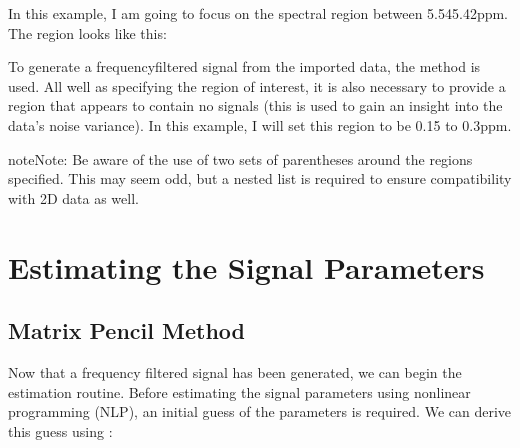 \documentclass[letterpaper,10pt,english]{sphinxmanual}
\let\sphinxpxdimen\pdfpxdimen\else\newdimen\sphinxpxdimen
\begin{document}
\sphinxAtStartPar
In this example, I am going to focus on the spectral region between
5.54\sphinxhyphen{}5.42ppm. The region looks like this:

\noindent{\hspace*{\fill}\sphinxincludegraphics[width=450\sphinxpxdimen]{{spectral_region}.png}\hspace*{\fill}}

\sphinxAtStartPar
To generate a frequency\sphinxhyphen{}filtered signal from the imported data, the
{\hyperref[\detokenize{references/core:nmrespy.core.Estimator.frequency_filter}]{}} method is used. All well as
specifying the region of interest, it is also necessary to provide a region
that appears to contain no signals (this is used to gain an insight into the
data’s noise variance). In this example, I will set this region to be \sphinxhyphen{}0.15 to
\sphinxhyphen{}0.3ppm.

\begin{sphinxVerbatim}[commandchars=\\\{\}]
\PYG{p}{[}\PYG{p}{[} \PYG{p}{]}\PYG{p}{]} \PYG{p}{[}\PYG{p}{[} \PYG{p}{]}\PYG{p}{]}
\end{sphinxVerbatim}

\begin{sphinxadmonition}{note}{Note:}
\sphinxAtStartPar
Be aware of the use of two sets of parentheses around the regions specified.
This may seem odd, but a nested list is required to ensure compatibility
with 2D data as well.
\end{sphinxadmonition}


\section{Estimating the Signal Parameters}
\label{\detokenize{walkthrough:estimating-the-signal-parameters}}

\subsection{Matrix Pencil Method}
\label{\detokenize{walkthrough:matrix-pencil-method}}
\sphinxAtStartPar
Now that a frequency filtered signal has been generated, we can begin the
estimation routine. Before estimating the signal parameters using nonlinear
programming (NLP), an initial guess of the parameters is required. We can derive
this guess using {\hyperref[\detokenize{references/core:nmrespy.core.Estimator.matrix_pencil}]{}}:
\end{document}
